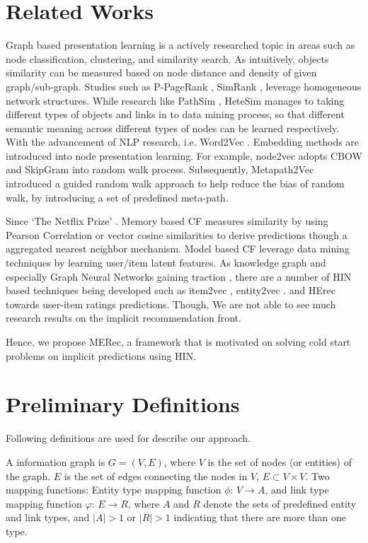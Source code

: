 \section{Related Works}
Graph based presentation learning is a actively researched topic in areas such as node classification, clustering, and similarity search. As intuitively, objects similarity can be measured based on node distance and density of given graph/sub-graph. Studies such as P-PageRank \cite{bahmani2010fast}, SimRank \cite{jeh2002simrank}, leverage homogeneous network structures. While research like PathSim \cite{sun2011pathsim}, HeteSim \cite{shi2014hetesim} manages to taking different types of objects and links in to data mining process, so that different semantic meaning across different types of nodes can be learned respectively. With the advancement of NLP research, i.e. Word2Vec \cite{mikolov2013efficient}. Embedding methods are introduced into node presentation learning. For example, node2vec \cite{grover2016node2vec} adopts CBOW and SkipGram into random walk process. Subsequently, Metapath2Vec \cite{dong2017metapath2vec} introduced a guided random walk approach to help reduce the bias of random walk, by introducing a set of predefined meta-path. 

Since `The Netflix Prize' \cite{bennett2007netflix}. Memory based CF measures similarity by using Pearson Correlation or vector cosine similarities to derive predictions though a aggregated nearest neighbor mechanism. Model based CF leverage data mining techniques by learning user/item latent features. As knowledge graph and especially Graph Neural Networks gaining traction \cite{wu2019comprehensive}, there are a number of HIN based techniques being developed such as item2vec \cite{Barkan2016}, entity2vec \cite{palumbo2017entity2rec}. and HErec \cite{shi2018heterogeneous} towards user-item ratings predictions. Though, We are not able to see much research results on the implicit recommendation front. 

Hence, we propose MERec, a framework that is motivated on solving cold start problems on implicit predictions using HIN. 


\section{Preliminary Definitions}\label{3PD}
Following definitions are used for describe our approach.

\begin{definition}
A information graph is $G = (V,E)$, where $V$ is the set of nodes (or entities) of the graph. $E$ is the set of edges connecting the nodes in $V$, $E \subset V \times V$. \newline
Two mapping functions: Entity type mapping function $\phi$: $V \rightarrow A$, and link type mapping function $\varphi$: $E \rightarrow R$, where $A$ and $R$ denote the sets of predefined entity and link types, and $|A| > 1$ or $|R| > 1$ indicating that there are more than one type.
\end{definition}

